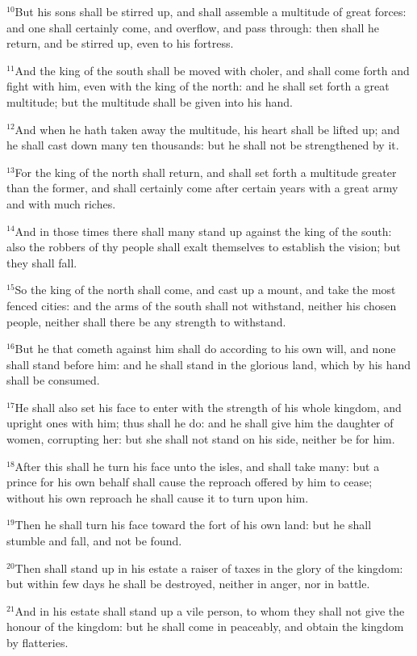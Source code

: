 \documentclass[12pt]{article}
\begin{document}
$^{10}$But his sons shall be stirred up, and shall assemble a multitude
of great forces: and one shall certainly come, and overflow, and pass
through: then shall he return, and be stirred up, even to his
fortress.


$^{11}$And the king of the south shall be moved with choler, and shall
come forth and fight with him, even with the king of the north: and he
shall set forth a great multitude; but the multitude shall be given
into his hand.


$^{12}$And when he hath taken away the multitude, his heart shall be
lifted up; and he shall cast down many ten thousands: but he shall not
be strengthened by it.


$^{13}$For the king of the north shall return, and shall set forth a
multitude greater than the former, and shall certainly come after
certain years with a great army and with much riches.


$^{14}$And in those times there shall many stand up against the king of
the south: also the robbers of thy people shall exalt themselves to
establish the vision; but they shall fall.


$^{15}$So the king of the north shall come, and cast up a mount, and
take the most fenced cities: and the arms of the south shall not
withstand, neither his chosen people, neither shall there be any
strength to withstand.


$^{16}$But he that cometh against him shall do according to his own
will, and none shall stand before him: and he shall stand in the
glorious land, which by his hand shall be consumed.


$^{17}$He shall also set his face to enter with the strength of his
whole kingdom, and upright ones with him; thus shall he do: and he
shall give him the daughter of women, corrupting her: but she shall
not stand on his side, neither be for him.


$^{18}$After this shall he turn his face unto the isles, and shall take
many: but a prince for his own behalf shall cause the reproach offered
by him to cease; without his own reproach he shall cause it to turn
upon him.


$^{19}$Then he shall turn his face toward the fort of his own land: but
he shall stumble and fall, and not be found.


$^{20}$Then shall stand up in his estate a raiser of taxes in the glory
of the kingdom: but within few days he shall be destroyed, neither in
anger, nor in battle.


$^{21}$And in his estate shall stand up a vile person, to whom they
shall not give the honour of the kingdom: but he shall come in
peaceably, and obtain the kingdom by flatteries.
\end{document}
